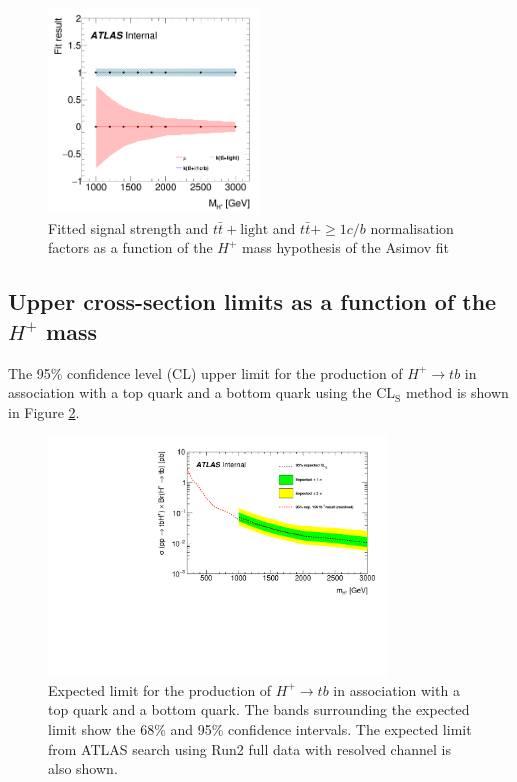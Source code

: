 \begin{figure}[H]
  \centering
  \includegraphics[width=0.50\textwidth]{images/ProfileLHFit/FitResults.png}
  \caption{Fitted signal strength and $t\bar{t}+\text{light}$ and $t\bar{t}+{\geq}1c/b$ normalisation factors as a function of the $H^{+}$ mass hypothesis of the Asimov fit}
  \label{fig:AsimovFitResultsSummary}
\end{figure}
\subsection{Upper cross-section limits as a function of the $H^{+}$ mass}
\label{subsec:Upperlimits}
The 95\% confidence level (CL) upper limit for the production of $H^{+}{\rightarrow}tb$ in association with a top quark and a bottom quark using the $\text{CL}_{\text{S}}$ method is shown in Figure \ref{fig:XSLimits_Hp}.

\begin{figure}[H]
  \centering
  \includegraphics[width=0.8\textwidth]{images/ProfileLHFit/XSLimit_Hp.pdf}
  \caption{Expected limit for the production of $H^{+}{\rightarrow}tb$ in association with a top quark and a bottom quark. The bands surrounding the expected limit show the 68\% and 95\% confidence intervals. The expected limit from ATLAS search using Run2 full data with resolved channel is also shown\cite{HDBS-2021-02}.}
  \label{fig:XSLimits_Hp}
\end{figure}
